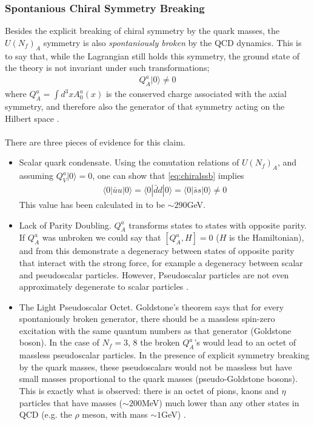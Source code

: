 \subsubsection{Spontanious Chiral Symmetry Breaking}

Besides the explicit breaking of chiral symmetry by the quark masses, the $U(N_f)_A$ symmetry is also {\it{spontaniously broken}} by the QCD dynamics. This is to say that, while the Lagrangian still holds this symmetry, the ground state of the theory is not invariant under such transformations;
\begin{align}
  Q_A^a | 0 \rangle \neq 0
  \label{eq:chiralssb}
\end{align}
where $Q_A^a = \int d^3x A_0^a(x)$ is the conserved charge associated with the axial symmetry, and therefore also the generator of that symmetry acting on the Hilbert space \cite{Scherer:2002tk}.
\\ \\
There are three pieces of evidence for this claim.
\begin{itemize}
\item
  Scalar quark condensate. Using the comutation relations of $U(N_f)_A$, and assuming $Q_V^a | 0 \rangle = 0$, one can show that \eqref{eq:chiralssb} implies
  \begin{align}
    \langle 0 | \bar{u} u | 0 \rangle = \langle 0 | \bar{d} d | 0 \rangle = \langle 0 | \bar{s} s | 0 \rangle \neq 0
  \end{align}
  This value has been calculated in \cite{PhysRevD.87.034503} to be $\sim 290$GeV.
\item
  Lack of Parity Doubling. $Q^a_A$ transforms states to states with opposite parity. If $Q^a_A$ was unbroken we could say that $[Q_A^a,H]=0$ ($H$ is the Hamiltonian), and from this demonstrate a degeneracy between states of opposite parity that interact with the strong force, for example a degeneracy between scalar and pseudoscalar particles. However, Pseudoscalar particles are not even approximately degenerate to scalar particles \cite{Patrignani:2016xqp}.
\item
  The Light Pseudoscalar Octet. Goldstone's theorem says that for every spontaniously broken generator, there should be a massless spin-zero excitation with the same quantum numbers as that generator (Goldstone boson). In the case of $N_f=3$, 8 the broken $Q_A^a$'s would lead to an octet of massless pseudoscalar particles. In the presence of explicit symmetry breaking by the quark masses, these pseudoscalars would not be massless but have small masses proportional to the quark masses (pseudo-Goldstone bosons). This is exactly what is observed: there is an octet of pions, kaons and $\eta$ particles that have masses ($\sim 200$MeV) much lower than any other states in QCD (e.g. the $\rho$ meson, with mass $\sim 1$GeV) {\color{red}{ref!}}.
\end{itemize}
